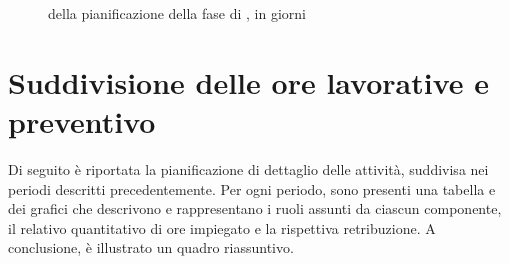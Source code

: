 \begin{figure}[H]
\label{tab:ganttpa1}
\caption{ della pianificazione della fase di \VV, in giorni}
\end{figure}

\pagebreak
	
\section{Suddivisione delle ore lavorative e preventivo} \label{sec:preventivo}
Di seguito è riportata la pianificazione di dettaglio delle attività, suddivisa nei periodi descritti precedentemente. Per ogni periodo, sono presenti una tabella e dei grafici che descrivono e rappresentano i ruoli assunti da ciascun componente, il relativo quantitativo di ore impiegato e la rispettiva retribuzione.
A conclusione, è illustrato un quadro riassuntivo.


\newcommand{\roww}[7]{
	#1 & #2 & #3 & #4 & #5 & #6 & #7
}

\newcommand{\x}[7]{

\begin{figure}[h]
  \begin{tabular}{ | l | c | c | c | c | c | c | r   }
    \hline
    Ruolo / persona & \R & \AM & \AN & \PJ & \PG & \V & Totale ore per persona \\ \hline
    \PB & \roww[#1] \\ \hline
    \LB & \roww[#2] \\ \hline
    \GG & \roww[#3] \\ \hline
    \MM & \roww[#4] \\ \hline
    \LS & \roww[#5] \\ \hline
    \AZ & \roww[#6] \\ \hline
    Totale ore per ruolo & \roww[#7] \\ \hline
  \end{tabular}
\end{figure} 
}

